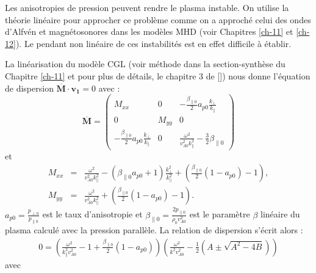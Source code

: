 Les anisotropies de pression peuvent rendre le plasma instable. On utilise la théorie linéaire pour approcher ce problème comme on a approché celui des ondes d'Alfvén et magnétosonores dans les modèles \ac{MHD} (voir Chapitres \ref{ch-11} et \ref{ch-12}). Le pendant non linéaire de ces instabilités est en effet difficile à établir. 

La linéarisation du modèle \ac{CGL} (voir méthode dans la section-synthèse du Chapitre \ref{ch-11} et pour plus de détails, le chapitre 3 de [\cite{hunana_introductory_2019}]) nous donne l'équation de dispersion $\overline{\boldsymbol{M}}\cdot \boldsymbol{v_1} = 0$ avec : 
\begin{equation}
 \overline{\boldsymbol{M}} =    \begin{pmatrix}
\label{eq:lin_cpg_eqdis}  M_{xx}   & 0 & -  \frac{\beta_{\parallel 0}}{2} a_{p0}  \frac{k_{\perp}}{k_{\parallel}} \\
    0 &  M_{yy} & 0 \\
      - \frac{\beta_{\parallel 0}}{2} a_{p0} \frac{k_{\perp}}{k_{\parallel}} & 0 &\frac{\omega^2}{ v^2_{A0}k^2_{\parallel}} -  \frac{3}{2} \beta_{\parallel 0}  
    \end{pmatrix} 
\end{equation}
et 
\begin{eqnarray*}
    M_{xx} &=& \frac{\omega^2}{v^2_{A0}k^2_{\parallel}} -  \left(\beta_{\parallel 0} a_{p0}+1\right)  \frac{k^2_{\perp}}{k^2_{\parallel}} +   \left(\frac{\beta_{\parallel 0}}{2} \left(1-a_{p0}\right)-1\right) , \\
    M_{yy}& =& \frac{\omega^2}{v^2_{A0}k^2_{\parallel}} +   \left(\frac{\beta_{\parallel 0}}{2} \left(1-a_{p0}\right)-1\right) .
\end{eqnarray*}
$a_{p0} = \frac{p_{\perp 0}}{p_{\parallel 0}}$ est le taux d'anisotropie et $\beta_{\parallel 0} = \frac{2 p_{\parallel 0}}{\rho_0 v^2_{A0}}$ est le paramètre $\beta$ linéaire du plasma calculé avec la pression parallèle. La relation de dispersion s'écrit alors : 
\begin{eqnarray}
 \label{eq:lin_cpg_disp}   0 = \left(\frac{\omega^2}{k^2_{\parallel} v^2_{A0}} - 1 +   \frac{\beta_{\parallel 0}}{2} \left(1-a_{p0}\right) \right)\left(\frac{\omega^2}{k^2 v^2_{A0}} - \frac{1}{2}\left(A \pm \sqrt{A^2-4B}\right)\right)
\end{eqnarray}
avec 
